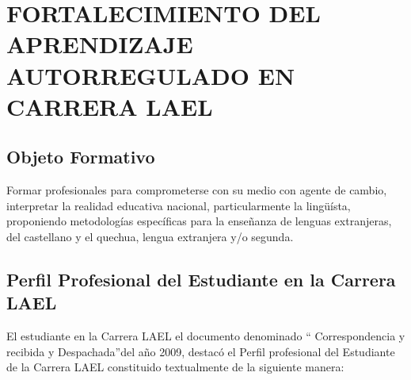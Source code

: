 \chapter{FORTALECIMIENTO DEL APRENDIZAJE AUTORREGULADO EN CARRERA LAEL}

\section{Objeto Formativo}

Formar profesionales para comprometerse con su medio con agente de cambio, 
interpretar la realidad educativa nacional, particularmente la ling\"{u}\'{i}sta,
proponiendo metodolog\'{i}as espec\'{i}ficas para la ense\~{n}anza de lenguas
extranjeras, del castellano y el quechua, lengua extranjera y/o segunda.

\section{Perfil Profesional del Estudiante en la Carrera LAEL}

El estudiante en la Carrera LAEL el documento denominado \textquotedblleft 
Correspondencia y recibida y Despachada\textquotedblright del a\~{n}o 2009,
destac\'{o} el Perfil profesional del Estudiante de la Carrera LAEL constituido
textualmente de la siguiente manera:

